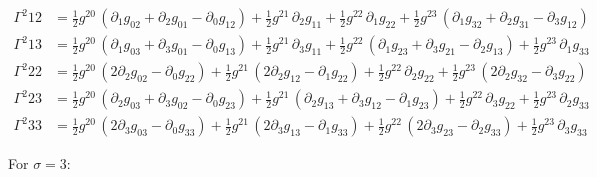\documentclass[
]{article}
\begin{document}
\[\begin{aligned}
\Gamma^{2}_{}{12} &= \tfrac{1}{2} g^{20}\, \left( \partial_{1} g_{02} + \partial_{2} g_{01} - \partial_{0} g_{12} \right) + \tfrac{1}{2} g^{21}\, \partial_{2} g_{11} + \tfrac{1}{2} g^{22}\, \partial_{1} g_{22} + \tfrac{1}{2} g^{23}\, \left( \partial_{1} g_{32} + \partial_{2} g_{31} - \partial_{3} g_{12} \right) \\
\Gamma^{2}_{}{13} &= \tfrac{1}{2} g^{20}\, \left( \partial_{1} g_{03} + \partial_{3} g_{01} - \partial_{0} g_{13} \right) + \tfrac{1}{2} g^{21}\, \partial_{3} g_{11} + \tfrac{1}{2} g^{22}\, \left( \partial_{1} g_{23} + \partial_{3} g_{21} - \partial_{2} g_{13} \right) + \tfrac{1}{2} g^{23}\, \partial_{1} g_{33} \\
\Gamma^{2}_{}{22} &= \tfrac{1}{2} g^{20}\, \left( 2 \partial_{2} g_{02} - \partial_{0} g_{22} \right) + \tfrac{1}{2} g^{21}\, \left( 2 \partial_{2} g_{12} - \partial_{1} g_{22} \right) + \tfrac{1}{2} g^{22}\, \partial_{2} g_{22} + \tfrac{1}{2} g^{23}\, \left( 2 \partial_{2} g_{32} - \partial_{3} g_{22} \right) \\
\Gamma^{2}_{}{23} &= \tfrac{1}{2} g^{20}\, \left( \partial_{2} g_{03} + \partial_{3} g_{02} - \partial_{0} g_{23} \right) + \tfrac{1}{2} g^{21}\, \left( \partial_{2} g_{13} + \partial_{3} g_{12} - \partial_{1} g_{23} \right) + \tfrac{1}{2} g^{22}\, \partial_{3} g_{22} + \tfrac{1}{2} g^{23}\, \partial_{2} g_{33} \\
\Gamma^{2}_{}{33} &= \tfrac{1}{2} g^{20}\, \left( 2 \partial_{3} g_{03} - \partial_{0} g_{33} \right) + \tfrac{1}{2} g^{21}\, \left( 2 \partial_{3} g_{13} - \partial_{1} g_{33} \right) + \tfrac{1}{2} g^{22}\, \left( 2 \partial_{3} g_{23} - \partial_{2} g_{33} \right) + \tfrac{1}{2} g^{23}\, \partial_{3} g_{33}
\end{aligned}\]

For \(\sigma = 3\):
\end{document}
